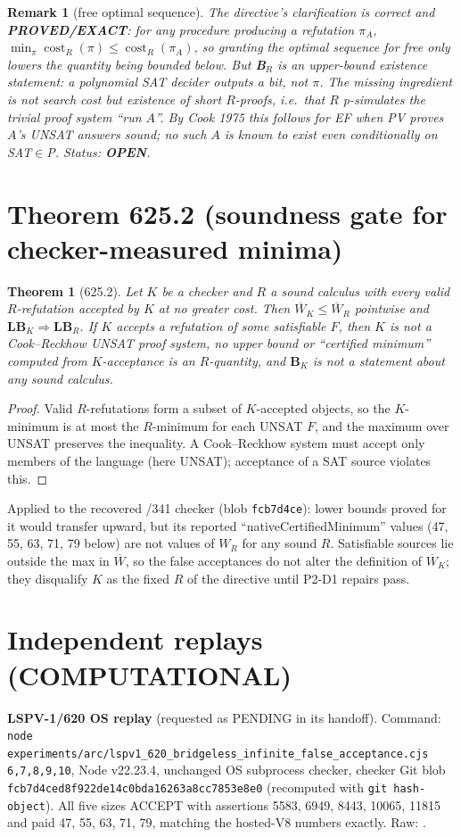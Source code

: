 \documentclass[11pt]{article}
\newtheorem{theorem}{Theorem}
\newtheorem{remark}{Remark}
\begin{document}
\begin{remark}[free optimal sequence]
The directive's clarification is correct and \textbf{PROVED/EXACT}: for any procedure producing a refutation $\pi_A$, $\min_\pi\operatorname{cost}_R(\pi)\le\operatorname{cost}_R(\pi_A)$, so granting the optimal sequence for free only lowers the quantity being bounded below. But \textbf{B}$_R$ is an \emph{upper-bound existence} statement: a polynomial SAT decider outputs a bit, not $\pi$. The missing ingredient is not search cost but existence of short $R$-proofs, i.e.\ that $R$ p-simulates the trivial proof system ``run $A$''. By Cook 1975 this follows for EF when PV proves $A$'s UNSAT answers sound; no such $A$ is known to exist even conditionally on SAT$\in$P. Status: \textbf{OPEN}.
\end{remark}

\section*{Theorem 625.2 (soundness gate for checker-measured minima)}
\begin{theorem}[625.2]
Let $K$ be a checker and $R$ a sound calculus with every valid $R$-refutation accepted by $K$ at no greater cost. Then $\overline W_K\le\overline W_R$ pointwise and $\textbf{LB}_K\Rightarrow\textbf{LB}_R$. If $K$ accepts a refutation of some satisfiable $F$, then $K$ is not a Cook--Reckhow UNSAT proof system, no upper bound or ``certified minimum'' computed from $K$-acceptance is an $R$-quantity, and $\textbf{B}_K$ is not a statement about any sound calculus.
\end{theorem}
\begin{proof}
Valid $R$-refutations form a subset of $K$-accepted objects, so the $K$-minimum is at most the $R$-minimum for each UNSAT $F$, and the maximum over UNSAT preserves the inequality. A Cook--Reckhow system must accept only members of the language (here UNSAT); acceptance of a SAT source violates this.
\end{proof}
\noindent Applied to the recovered /341 checker (blob \texttt{fcb7d4ce}): lower bounds proved for it would transfer upward, but its reported ``nativeCertifiedMinimum'' values (47, 55, 63, 71, 79 below) are not values of $W_R$ for any sound $R$. Satisfiable sources lie outside the max in $\overline W$, so the false acceptances do not alter the definition of $\overline W_K$; they disqualify $K$ as the fixed $R$ of the directive until P2-D1 repairs pass.

\section*{Independent replays (COMPUTATIONAL)}
\textbf{LSPV-1/620 OS replay} (requested as PENDING in its handoff). Command: \texttt{node experiments/arc/lspv1\_620\_bridgeless\_infinite\_false\_acceptance.cjs 6,7,8,9,10}, Node v22.23.4, unchanged OS subprocess checker, checker Git blob \texttt{fcb7d4ced8f922de14c0bda16263a8cc7853e8e0} (recomputed with \texttt{git hash-object}). All five sizes ACCEPT with assertions 5583, 6949, 8443, 10065, 11815 and paid 47, 55, 63, 71, 79, matching the hosted-V8 numbers exactly. Raw: .
\end{document}
